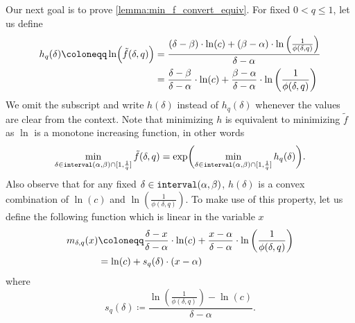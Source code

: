 \documentclass[letterpaper,11pt]{article}
\newcommand{\1}[1]{\mathds{1}\left[#1\right]}
\newcommand{\goodd}{\textnormal{\texttt{interval}}(\alpha, \beta)}
\begin{document}
Our next goal is to prove \cref{lemma:min_f_convert_equiv}.
For fixed $0 < q \leq 1$, let us define
\begin{align*}
	h_{q}(\delta) \coloneqq \ln\Bigl(\tilde{f}(\delta,q)\Bigr) &=  \frac{(\delta - \beta) \cdot \ln(c) + (\beta - \alpha) \cdot \ln\left( \frac{1}{\phi(\delta, q)} \right) }{\delta - \alpha}\\
	&=  \frac{\delta - \beta}{\delta - \alpha} \cdot \ln(c) + \frac{\beta - \alpha}{\delta - \alpha}\cdot \ln\left( \frac{1}{\phi(\delta,q)} \right)
\end{align*}
We omit the subscript and write $h(\delta)$ instead of $h_{q}(\delta)$ whenever the values are clear from the context.
Note that minimizing $h$ is equivalent to minimizing $\tilde{f}$ as $\ln$ is a monotone increasing function,
in other words
\begin{equation}\label{eq:f_h_equivalence}
	\min_{\delta \in \goodd \cap [1,\frac{1}{q}]} \tilde{f}(\delta,q) = \exp\biggl(\min_{\delta \in \goodd \cap [1,\frac{1}{q}]} h_{q}(\delta)\biggr).
\end{equation}
Also observe that for any fixed $\delta \in \goodd$, $h(\delta)$ is a convex combination of $\ln(c)$ and $\ln\left( \frac{1}{\phi(\delta,q)} \right)$.
To make use of this property, let us define the following function which is linear in the variable $x$
\begin{align}
	m_{\delta,q}(x) &\coloneqq \frac{\delta - x}{\delta - \alpha} \cdot \ln(c) + \frac{x - \alpha}{\delta - \alpha}\cdot \ln\left( \frac{1}{\phi(\delta,q)} \right)\notag\\ 
				 &= \ln(c) +  s_q(\delta) \cdot (x - \alpha) \label{eq:m_slope}
\end{align}
where
\begin{equation*}
	s_q(\delta) \coloneqq \frac{\ln\left( \frac{1}{\phi(\delta,q)} \right) - \ln(c)}{\delta - \alpha}.
\end{equation*}
\end{document}
